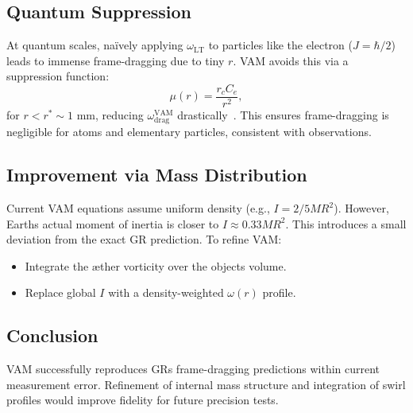 \subsection*{Quantum Suppression}
At quantum scales, naïvely applying $\omega_\text{LT}$ to particles like the electron ($J = \hbar/2$) leads to immense frame-dragging due to tiny $r$. VAM avoids this via a suppression function:
\[
    \mu(r) = \frac{r_c C_e}{r^2},
\]
for $r < r^* \sim 1$ mm, reducing $\omega^\text{VAM}_\text{drag}$ drastically~\cite{iskandarani2025VAM2}. This ensures frame-dragging is negligible for atoms and elementary particles, consistent with observations.

\subsection*{Improvement via Mass Distribution}
Current VAM equations assume uniform density (e.g., $I = 2/5MR^2$). However, Earth\rqs s actual moment of inertia is closer to $I \approx 0.33MR^2$. This introduces a small deviation from the exact GR prediction. To refine VAM:
\begin{itemize}
    \item Integrate the æther vorticity over the object\rqs s volume.
    \item Replace global $I$ with a density-weighted $\omega(r)$ profile.
\end{itemize}

\subsection*{Conclusion}
VAM successfully reproduces GR\rqs s frame-dragging predictions within current measurement error. Refinement of internal mass structure and integration of swirl profiles would improve fidelity for future precision tests.